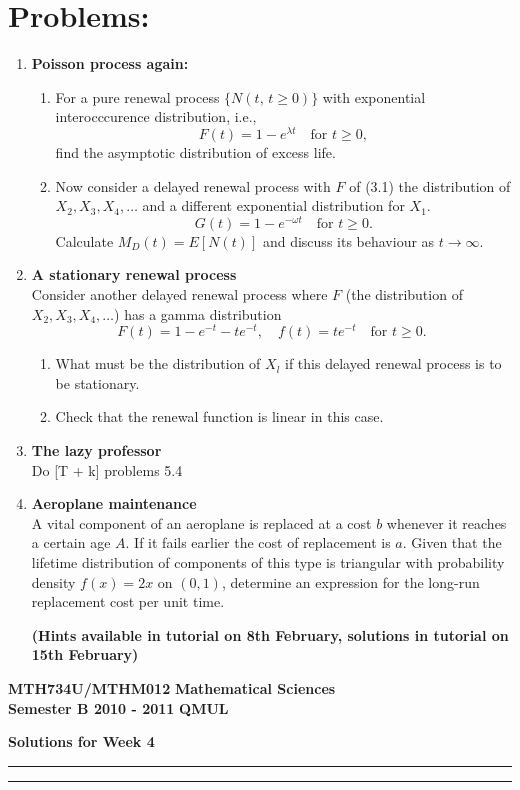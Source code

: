 \documentclass[11pt,a4paper]{article}
\begin{document}
  \section*{Problems:}
  \begin{enumerate}
    \item \textbf{Poisson process again:}
    \begin{enumerate}
      \item For a pure renewal process $\{N(t,\, t\geq 0)\}$ with exponential interocccurence distribution,
      i.e.,
      \begin{equation}\tag{3.1}
        F(t) = 1 - e^{\lambda t}\quad\text{for $t \geq 0$},
      \end{equation} 
      find the asymptotic distribution of excess life.
      \item Now consider a delayed renewal process with $F$ of (3.1) the distribution of $X_2, X_3,\allowbreak X_4,\ldots$ and a different exponential distribution for $X_1$.
      $$
      G(t) = 1 - e^{-\omega t}\quad \text{for $t \geq 0$}.
      $$
      Calculate $M_D(t) = E[N(t)]$ and discuss its behaviour as $t \to \infty$.
    \end{enumerate}
    \item \textbf{A stationary renewal process}\\
    Consider another delayed renewal process where $F$ (the distribution of $X_2, X_3, X_4,\ldots$) has a gamma distribution
    $$
    F(t) = 1 - e^{-t} - te^{-t},\quad f(t) = te^{-t}\quad \text{for $t \geq 0$}.
    $$
    \begin{enumerate}
      \item What must be the distribution of $X_l$ if this delayed renewal process is to be stationary.
      \item Check that the renewal function is linear in this case.
    \end{enumerate}
    \item \textbf{The lazy professor}\\
    Do [T + k] problems 5.4
    \item \textbf{Aeroplane maintenance}\\
    A vital component of an aeroplane is replaced at a cost $b$ whenever it reaches a certain age $A$. If it fails earlier the cost of replacement is $a$. Given that the lifetime distribution of components of this type is triangular with probability density $f(x) = 2x$ on $(0, 1)$, determine an expression for the long-run replacement cost per unit time.
    \vspace{1cm}
    \begin{center}
      \textbf{(Hints available in tutorial on 8th February, solutions in tutorial on 15th February)}
    \end{center}
  \end{enumerate}
  \newpage
  \textbf{MTH734U/MTHM012} \hfill \textbf{Mathematical Sciences}\\
  \textbf{Semester B 2010 - 2011} \hfill \textbf{QMUL}
  \begin{center}
    \textbf{\huge Solutions for Week 4}
  \end{center}
  \hrule \vspace{2mm} \hrule
\end{document}
